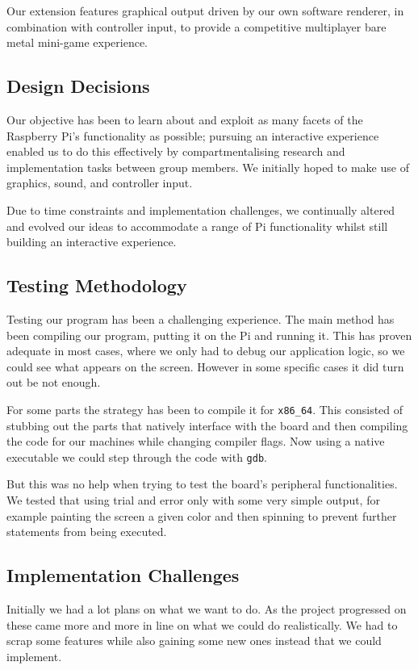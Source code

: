 \documentclass[11pt]{article}
\begin{document}
Our extension features graphical output driven by our own software renderer, in
combination with controller input, to provide a competitive multiplayer bare
metal mini-game experience.

\subsection{Design Decisions}

Our objective has been to learn about and exploit as many facets of the
Raspberry Pi's functionality as possible; pursuing an interactive experience
enabled us to do this effectively by compartmentalising research and
implementation tasks between group members. We initially hoped to make use of
graphics, sound, and controller input.

Due to time constraints and implementation challenges, we continually altered
and evolved our ideas to accommodate a range of Pi functionality whilst still
building an interactive experience.

\subsection{Testing Methodology}

Testing our program has been a challenging experience. The main method has been
compiling our program, putting it on the Pi and running it. This has proven
adequate in most cases, where we only had to debug our application logic, so we
could see what appears on the screen. However in some specific cases it did turn
out be not enough.

For some parts the strategy has been to compile it for \texttt{x86\_64}. This
consisted of stubbing out the parts that natively interface with the board and
then compiling the code for our machines while changing compiler flags. Now
using a native executable we could step through the code with \texttt{gdb}.

But this was no help when trying to test the board's peripheral functionalities.
We tested that using trial and error only with some very simple output, for
example painting the screen a given color and then spinning to prevent further
statements from being executed.

\subsection{Implementation Challenges}

Initially we had a lot plans on what we want to do. As the project progressed on
these came more and more in line on what we could do realistically. We had to
scrap some features while also gaining some new ones instead that we could
implement.
\end{document}
